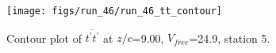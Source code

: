 \begin{figure}[H]
\centering
\texttt{[image: figs/run\_46/run\_46\_tt\_contour]}
\caption{Contour plot of $\overline{t^\prime t^\prime}$ at $z/c$=9.00, $V_{free}$=24.9, station 5.}
\end{figure}


